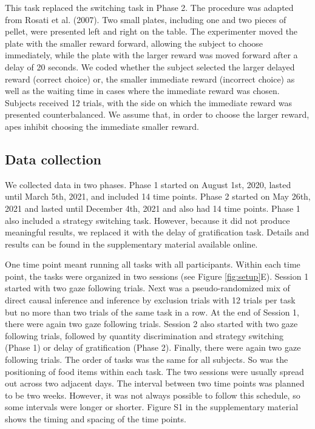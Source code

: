 \documentclass[
  man,floatsintext]{apa6}
\begin{document}
This task replaced the switching task in Phase 2. The procedure was adapted from Rosati et al. (2007). Two small plates, including one and two pieces of pellet, were presented left and right on the table. The experimenter moved the plate with the smaller reward forward, allowing the subject to choose immediately, while the plate with the larger reward was moved forward after a delay of 20 seconds. We coded whether the subject selected the larger delayed reward (correct choice) or, the smaller immediate reward (incorrect choice) as well as the waiting time in cases where the immediate reward was chosen. Subjects received 12 trials, with the side on which the immediate reward was presented counterbalanced. We assume that, in order to choose the larger reward, apes inhibit choosing the immediate smaller reward.

\hypertarget{data-collection}{%
\subsection{Data collection}\label{data-collection}}

We collected data in two phases. Phase 1 started on August 1st, 2020, lasted until March 5th, 2021, and included 14 time points. Phase 2 started on May 26th, 2021 and lasted until December 4th, 2021 and also had 14 time points. Phase 1 also included a strategy switching task. However, because it did not produce meaningful results, we replaced it with the delay of gratification task. Details and results can be found in the supplementary material available online.

One time point meant running all tasks with all participants. Within each time point, the tasks were organized in two sessions (see Figure \ref{fig:setup}E). Session 1 started with two gaze following trials. Next was a pseudo-randomized mix of direct causal inference and inference by exclusion trials with 12 trials per task but no more than two trials of the same task in a row. At the end of Session 1, there were again two gaze following trials. Session 2 also started with two gaze following trials, followed by quantity discrimination and strategy switching (Phase 1) or delay of gratification (Phase 2). Finally, there were again two gaze following trials. The order of tasks was the same for all subjects. So was the positioning of food items within each task. The two sessions were usually spread out across two adjacent days. The interval between two time points was planned to be two weeks. However, it was not always possible to follow this schedule, so some intervals were longer or shorter. Figure S1 in the supplementary material shows the timing and spacing of the time points.
\end{document}
